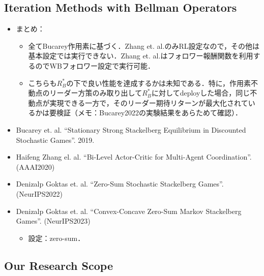 \documentclass[a4paper,10pt,dvipdfmx]{jsarticle}
\begin{document}
\subsection{Iteration Methods with Bellman Operators}

\begin{itemize}
    \item まとめ：
    \begin{itemize}
        \item 全てBucarey\cite{Bucarey2022-ro}作用素に基づく．Zhang et. al.\cite{Zhang2020-hw}のみRL設定なので，その他は基本設定では実行できない．Zhang et. al.\cite{Zhang2020-hw}はフォロワー報酬関数を利用するのでWBフォロワー設定で実行可能．
        \item こちらも$R_B^*$の下で良い性能を達成するかは未知である．特に，作用素不動点のリーダー方策のみ取り出して$R_B^*$に対してdeployした場合，同じ不動点が実現できる一方で，そのリーダー期待リターンが最大化されているかは要検証（メモ：Bucarey2022\cite{Bucarey2022-ro}の実験結果をあらためて確認）．
    \end{itemize}
    \item Bucarey et. al. ``Stationary Strong Stackelberg Equilibrium in Discounted Stochastic Games''. 2019.\cite{Bucarey2022-ro}
    \item Haifeng Zhang el. al. ``Bi-Level Actor-Critic for Multi-Agent Coordination''. (AAAI2020)\cite{Zhang2020-hw}
    \item Denizalp Goktas et. al. ``Zero-Sum Stochastic Stackelberg Games''. (NeurIPS2022)\cite{Goktas2024-vt}
    \item Denizalp Goktas et. al. ``Convex-Concave Zero-Sum Markov Stackelberg Games''. (NeurIPS2023)\cite{Goktas2024-pp}
    \begin{itemize}
        \item 設定：zero-sum．
    \end{itemize}
\end{itemize}

\subsection{Our Research Scope}
\end{document}
